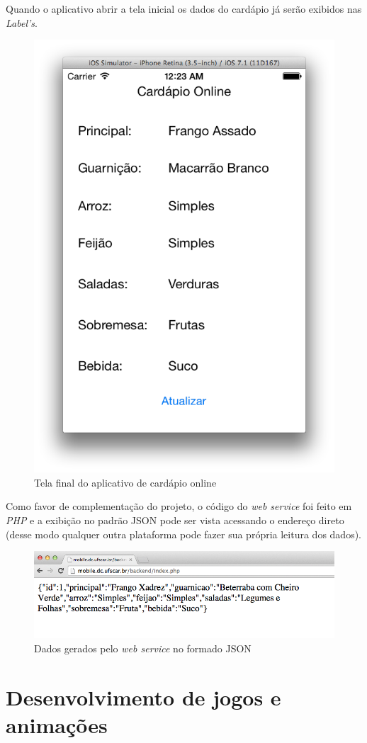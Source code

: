\documentclass[a4paper,12pt,brazil,oneside]{book}
\begin{document}
Quando o aplicativo abrir a tela inicial os dados do cardápio já serão exibidos nas \emph{Label's}.

\begin{figure}[H]
  \centering
  \includegraphics[width=.55\textwidth]{figuras/5/APP_Cardapio2.png}
  \caption{Tela final do aplicativo de cardápio online}
  \label{fig:app_cardapio2}
\end{figure}

Como favor de complementação do projeto, o código do \emph{web service} foi feito em \emph{PHP} e a exibição no padrão JSON pode ser vista acessando o endereço direto (desse modo qualquer outra plataforma pode fazer sua própria leitura dos dados).

\begin{figure}[H]
  \centering
  \includegraphics[width=.75\textwidth]{figuras/5/APP_Cardapio3.png}
  \caption{Dados gerados pelo \emph{web service} no formado JSON}
  \label{fig:a}
\end{figure}


\chapter{Desenvolvimento de jogos e animações}
\end{document}
